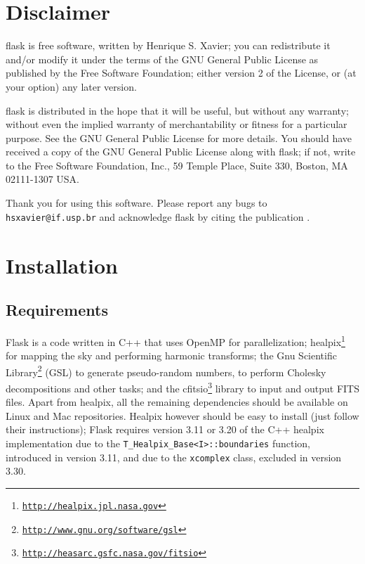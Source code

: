 \documentclass[12pt]{book} %
\begin{document}
\tableofcontents


\chapter{Disclaimer}
\label{sec:disclaimer}

   {\sc flask} is free software, written by Henrique S. Xavier; 
   you can redistribute it and/or modify it under the terms of the GNU 
   General Public License as published by the Free Software Foundation; 
   either version 2 of the License, or (at your option) any later version.

   {\sc flask} is distributed in the hope that it will be useful,
   but without any warranty; without even the implied warranty of
   merchantability or fitness for a particular purpose. See the
   GNU General Public License for more details. You should have received 
   a copy of the GNU General Public License along with {\sc flask}; if not, 
   write to the Free Software Foundation, Inc., 59 Temple Place, Suite 330, 
   Boston, MA  02111-1307  USA.

   Thank you for using this software. Please report any bugs to {\tt hsxavier@if.usp.br} and
   acknowledge {\sc flask} by citing the publication \citet{Xavier16mn}.
   

\chapter{Installation}
\label{sec:installation}

\section{Requirements}
\label{sec:requirements}

{\sc Flask} is a code written in {\sc C++} that uses {\sc OpenMP} for parallelization; 
{\sc healpix}\footnote{{\tt \href{http://healpix.jpl.nasa.gov}{http://healpix.jpl.nasa.gov}}} for 
mapping the sky and performing harmonic transforms; the Gnu Scientific 
Library\footnote{{\tt \href{http://www.gnu.org/software/gsl}{http://www.gnu.org/software/gsl}}} 
({\sc GSL}) to generate pseudo-random numbers, to perform Cholesky decompositions and other tasks; and the 
{\sc cfitsio}\footnote{{\tt \href{http://heasarc.gsfc.nasa.gov/fitsio}{http://heasarc.gsfc.nasa.gov/fitsio}}} 
library to input and output FITS files. Apart from {\sc healpix}, all the remaining dependencies should 
be available on Linux and Mac repositories. {\sc Healpix} however should be easy to install (just 
follow their instructions); {\sc Flask} requires version 3.11 or 3.20 of the C++ {\sc healpix} 
implementation due to the {\tt T\_Healpix\_Base<I>::boundaries} function, introduced in version 3.11, and 
due to the {\tt xcomplex} class, excluded in version 3.30. 
\end{document}
